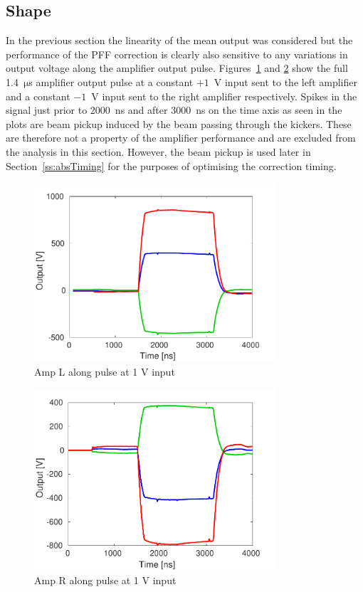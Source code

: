 \subsection{Shape}
\label{ss:ampShape}

In the previous section the linearity of the mean output was considered but the performance of the PFF correction is clearly also sensitive to any variations in output voltage along the amplifier output pulse. Figures~\ref{f:ampLTraces} and \ref{f:ampRTraces} show the full 1.4~\(\mathrm{\mu}\)s amplifier output pulse at a constant \(+1\)~V input sent to the left amplifier and a constant \(-1\)~V input sent to the right amplifier respectively. Spikes in the signal just prior to 2000~ns and after 3000~ns on the time axis as seen in the plots are beam pickup induced by the beam passing through the kickers. These are therefore not a property of the amplifier performance and are excluded from the analysis in this section. However, the beam pickup is used later in Section~\ref{ss:absTiming} for the purposes of optimising the correction timing.

\begin{figure}
  \centering
  \includegraphics[width=0.8\textwidth]{Figures/commissioning/AmpL_Traces}
  \caption{Amp L along pulse at 1 V input}
  \label{f:ampLTraces}
\end{figure}

\begin{figure}
  \centering
  \includegraphics[width=0.8\textwidth]{Figures/commissioning/AmpR_Traces}
  \caption{Amp R along pulse at 1 V input}
  \label{f:ampRTraces}
\end{figure}

